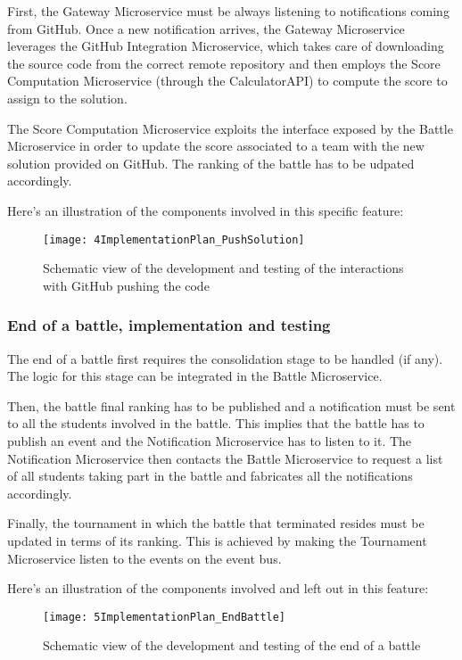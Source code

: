 First, the Gateway Microservice must be always listening to notifications coming from GitHub. Once a new notification arrives, the Gateway Microservice leverages the GitHub Integration Microservice, which takes care of downloading the source code from the correct remote repository and then employs the Score Computation Microservice (through the CalculatorAPI) to compute the score to assign to the solution.

The Score Computation Microservice exploits the interface exposed by the Battle Microservice in order to update the score associated to a team with the new solution provided on GitHub. The ranking of the battle has to be udpated accordingly.

Here's an illustration of the components involved in this specific feature:

\begin{figure}[h]
        \centering
	\texttt{[image: 4ImplementationPlan\_PushSolution]}
        \caption{Schematic view of the development and testing of the interactions with GitHub pushing the code}
\end{figure}
\newpage
\subsubsection*{End of a battle, implementation and testing}

The end of a battle first requires the consolidation stage to be handled (if any). The logic for this stage can be integrated in the Battle Microservice.

Then, the battle final ranking has to be published and a notification must be sent to all the students involved in the battle. This implies that the battle has to publish an event and the Notification Microservice has to listen to it. The Notification Microservice then contacts the Battle Microservice to request a list of all students taking part in the battle and fabricates all the notifications accordingly.


Finally, the tournament in which the battle that terminated resides must be updated in terms of its ranking. This is achieved by making the Tournament Microservice listen to the events on the event bus.

Here's an illustration of the components involved and left out in this feature:

\begin{figure}[h]
        \centering
	\texttt{[image: 5ImplementationPlan\_EndBattle]}
        \caption{Schematic view of the development and testing of the end of a battle}
\end{figure}



